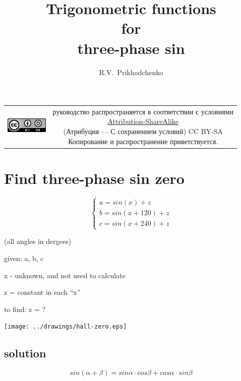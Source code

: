 \documentclass[unicode, 12pt, a4paper]{article}
\author{R.V.~Prikhodchenko}
\title{Trigonometric functions\\for\\three-phase sin}
\begin{document}
\maketitle



\begin{table}[ht]
  \begin{tabular}{cc}
    \includegraphics[width=2cm]{../CC_BY-SA_88x31.png} &
    \shortstack{руководство распространяется в соответствии с
      условиями\\
      \href{http://creativecommons.org/licenses/by-sa/3.0/}{Attribution-ShareAlike} \\
      (Атрибуция — С сохранением условий) CC BY-SA \\
      Копирование и распространение приветствуется.}
  \end{tabular}
\end{table}



\section{Find three-phase sin zero}

\begin{equation}
  \label{eq:zero-shift:three-phase-case}
  \begin{cases}
    a = sin(x)       + z\\
    b = sin(x + 120) + z\\
    c = sin(x + 240) + z
  \end{cases}
\end{equation}

(all angles in dergees)

given: a, b, c

x - unknown, and not need to calculate

z = constant in each ``x''

to find: z = ?

\texttt{[image: ../drawings/hall-zero.eps]}

\subsection{solution}

\begin{equation}
  \label{eq:trigonometric:rule:sin-a-plus-b}
    sin (\alpha + \beta) = sin \alpha \cdot cos \beta + cos \alpha \cdot sin \beta
\end{equation}
\end{document}
